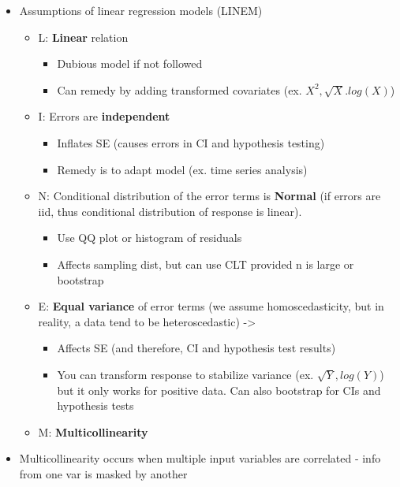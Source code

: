 \documentclass[8pt,landscape,a4paper, fleqn, dvipsnames]{extarticle}
\begin{document}
\begin{multicols*}{4}
\begin{itemize}
\begin{itemize}
    \end{itemize}
    \item Assumptions of linear regression models (LINEM)
    \begin{itemize}
        \item L: \textbf{Linear} relation
        \begin{itemize}
            \item Dubious model if not followed
            \item Can remedy by adding transformed covariates (ex. $X^2, \sqrt{X}. log(X)$)
        \end{itemize} 
        \item I: Errors are \textbf{independent} 
        \begin{itemize}
            \item Inflates SE (causes errors in CI and hypothesis testing)
            \item Remedy is to adapt model (ex. time series analysis)
        \end{itemize}
        \item N: Conditional distribution of the error terms is \textbf{Normal} (if errors are iid, thus conditional distribution of response is linear). 
        \begin{itemize}
            \item Use QQ plot or histogram of residuals
            \item Affects sampling dist, but can use CLT provided n is large or bootstrap
        \end{itemize}
        \item E: \textbf{Equal variance} of error terms (we assume homoscedasticity, but in reality, a data tend to be heteroscedastic) -> 
        \begin{itemize}
            \item Affects SE (and therefore, CI and hypothesis test results)
            \item You can transform response to stabilize variance (ex. $\sqrt{Y}, log(Y)$) but it only works for positive data. Can also bootstrap for CIs and hypothesis tests
        \end{itemize}
        \item M: \textbf{Multicollinearity}
    \end{itemize}
    \item Multicollinearity occurs when multiple input variables are correlated - info from one var is masked by another
    \begin{itemize}

\end{itemize}
\end{itemize}
\end{multicols*}
\end{document}
